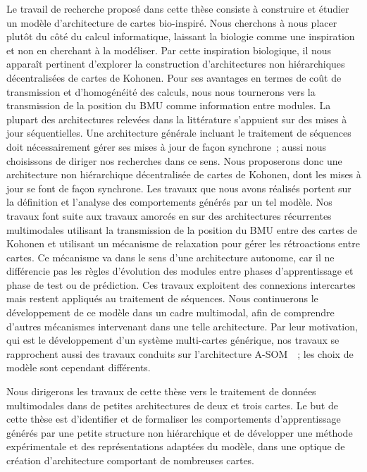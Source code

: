 \documentclass[../main]{subfiles}
\begin{document}
Le travail de recherche proposé dans cette thèse consiste à construire et étudier un modèle d'architecture de cartes bio-inspiré. Nous cherchons à nous placer plutôt du côté du calcul informatique, laissant la biologie comme une inspiration et non en cherchant à la modéliser. 
Par cette inspiration biologique, il nous apparaît pertinent d'explorer la construction d'architectures non hiérarchiques décentralisées de cartes de Kohonen. Pour ses avantages en termes de coût de transmission et d'homogénéité des calculs, nous nous tournerons vers la transmission de la position du BMU comme information entre modules.
La plupart des architectures relevées dans la littérature s'appuient sur des mises à jour séquentielles. 
Une architecture générale incluant le traitement de séquences doit nécessairement gérer ses mises à jour de façon synchrone~; aussi nous choisissons de diriger nos recherches dans ce sens.
Nous proposerons donc une architecture non hiérarchique décentralisée de cartes de Kohonen, dont les mises à jour se font de façon synchrone. Les travaux que nous avons réalisés portent sur la définition et l'analyse des comportements générés par un tel modèle.
Nos travaux font suite aux travaux amorcés en \cite{baheux_towards_2014} sur des architectures récurrentes multimodales utilisant la transmission de la position du BMU entre des cartes de Kohonen et utilisant un mécanisme de relaxation pour gérer les rétroactions entre cartes. Ce mécanisme va dans le sens d'une architecture autonome, car il ne différencie pas les règles d'évolution des modules entre phases d'apprentissage et phase de test ou de prédiction.
Ces travaux exploitent des connexions intercartes mais restent appliqués au traitement de séquences.
Nous continuerons le développement de ce modèle dans un cadre multimodal, afin de comprendre d'autres mécanismes intervenant dans une telle architecture.
Par leur motivation, qui est le développement d'un système multi-cartes générique, nos travaux se rapprochent aussi des travaux conduits sur l'architecture A-SOM~\cite{johnsson_associating_2008, johnsson_associative_2009,gil_sarasom_2015, Buonamente2015DiscriminatingAS}~; les choix de modèle sont cependant différents.

Nous dirigerons les travaux de cette thèse vers le traitement de données multimodales dans de petites architectures de deux et trois cartes. Le but de cette thèse est d'identifier et de formaliser les comportements d'apprentissage générés par une petite structure non hiérarchique et de développer une méthode expérimentale et des représentations adaptées du modèle, dans une optique de création d'architecture comportant de nombreuses cartes.


\ifSubfilesClassLoaded{
    \printbibliography
}{}
\end{document}

